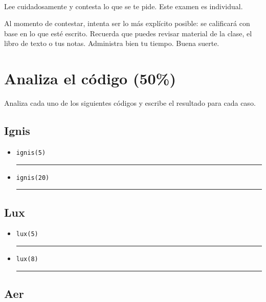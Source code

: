 \documentclass[11pt, onside]{article}
\title{
    \myclass \\
    \textbf{\mytitle} \\
    \myheader
    \date{}
}
\newcommand{\matlab}[1]{\lstinline[style=Matlab-bw]!#1!}
\newcommand{\shortresponserule}{{\large\rule{5 cm}{0.3mm}}}
\begin{document}
\maketitle

\vspace{-1.5cm}

Lee cuidadosamente y contesta lo que se te pide.
Este examen es individual.

Al momento de contestar, intenta ser lo más explícito posible: se calificará con base en lo que esté escrito. %
Recuerda que puedes revisar material de la clase, el libro de texto o tus notas.
Administra bien tu tiempo.
Buena suerte.

\section{Analiza el código (50\%)}

Analiza cada uno de los siguientes códigos y escribe el resultado para cada caso.

\subsection*{Ignis}



\begin{itemize}
    \item \matlab{ignis(5)} \hfill \shortresponserule
    \item \matlab{ignis(20)} \hfill \shortresponserule
\end{itemize}

\subsection*{Lux}



\begin{itemize}
    \item \matlab{lux(5)} \hfill \shortresponserule
    \item \matlab{lux(8)} \hfill \shortresponserule
\end{itemize}

\pagebreak

\subsection*{Aer}
\end{document}
